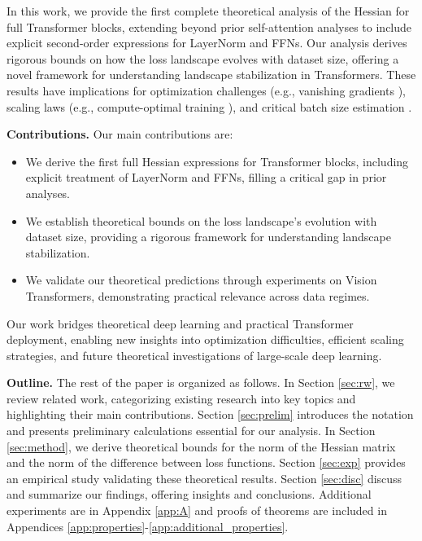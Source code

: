 \documentclass{article}
\begin{document}
In this work, we provide the first complete theoretical analysis of the Hessian for full Transformer blocks, extending beyond prior self-attention analyses \cite{ormaniec2024attentionhessian, zhang2024why} to include explicit second-order expressions for LayerNorm and FFNs.
Our analysis derives rigorous bounds on how the loss landscape evolves with dataset size, offering a novel framework for understanding landscape stabilization in Transformers. These results have implications for optimization challenges (e.g., vanishing gradients \cite{hochreiter1998vanishing}), scaling laws (e.g., compute-optimal training \cite{hoffmann2022training, kaplan2020scaling}), and critical batch size estimation \cite{mccandlish2018empirical, zhang2025how}. 

\textbf{Contributions.} Our main contributions are:
\begin{itemize}
    \item We derive the first full Hessian expressions for Transformer blocks, including explicit treatment of LayerNorm and FFNs, filling a critical gap in prior analyses.
    \item We establish theoretical bounds on the loss landscape’s evolution with dataset size, providing a rigorous framework for understanding landscape stabilization.
    \item We validate our theoretical predictions through experiments on Vision Transformers, demonstrating practical relevance across data regimes.
\end{itemize}

Our work bridges theoretical deep learning and practical Transformer deployment, enabling new insights into optimization difficulties, efficient scaling strategies, and future theoretical investigations of large-scale deep learning. %

\textbf{Outline.} The rest of the paper is organized as follows. In Section  \ref{sec:rw}, we review related work, categorizing existing research into key topics and highlighting their main contributions. Section \ref{sec:prelim} introduces the notation and presents preliminary calculations essential for our analysis. In Section \ref{sec:method}, we derive theoretical bounds for the norm of the Hessian matrix and the norm of the difference between loss functions. Section \ref{sec:exp} provides an empirical study validating these theoretical results. Section \ref{sec:disc} discuss and summarize our findings, offering insights and conclusions. Additional experiments are in Appendix \ref{app:A} and proofs of theorems are included in Appendices \ref{app:properties}-\ref{app:additional_properties}.
\end{document}
